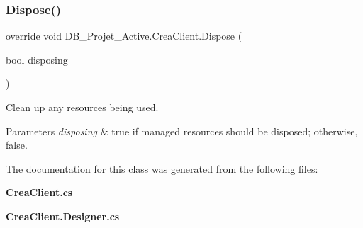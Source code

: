 \subsubsection{Dispose()}
{\footnotesize\ttfamily override void D\+B\+\_\+\+Projet\+\_\+\+Active.\+Crea\+Client.\+Dispose (\begin{DoxyParamCaption}\item[{bool}]{disposing }\end{DoxyParamCaption})\hspace{0.3cm}{\ttfamily [protected]}}



Clean up any resources being used. 


\begin{DoxyParams}{Parameters}
{\em disposing} & true if managed resources should be disposed; otherwise, false.\\
\hline
\end{DoxyParams}


The documentation for this class was generated from the following files\+:\begin{DoxyCompactItemize}
\item 
\textbf{ Crea\+Client.\+cs}\item 
\textbf{ Crea\+Client.\+Designer.\+cs}\end{DoxyCompactItemize}
